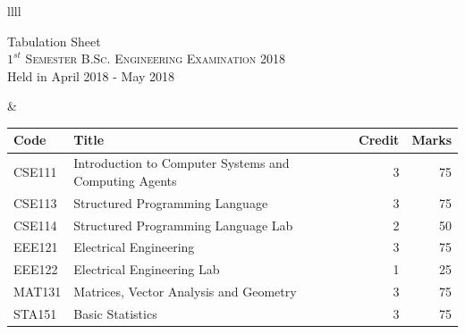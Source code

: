 \documentclass[11pt]{article}
\begin{document}
\begin{table}[ht]
\begin{tabularx}{\linewidth}{llll}
\begin{minipage}[m]{0.35\textwidth}
	\smallskip
	
	{\large {\sc Tabulation Sheet}}\\
	
	\smallskip
	\textsc{$1^{st}$ Semester B.Sc. Engineering Examination 2018}\\
	{Held in April 2018 - May 2018}\\
\end{minipage}
&
\hspace{1cm}
\begin{minipage}[m]{0.3\linewidth} \flushright
	\hspace{-5cm}
	\begin{small}
		\renewcommand{\arraystretch}{1.01}
		\begin{tabular} {|l|l|r|r|}
			\hline \hline Code & Title  & Credit &  Marks \\ \hline
\hline  CSE111 & Introduction to Computer Systems and Computing Agents & 3 & 75  \\
\hline  CSE113 & Structured Programming Language & 3 & 75  \\
\hline  CSE114 & Structured Programming Language Lab & 2 & 50  \\
\hline  EEE121 & Electrical Engineering & 3 & 75  \\
\hline  EEE122 & Electrical Engineering Lab & 1 & 25  \\
\hline  MAT131 & Matrices, Vector Analysis and Geometry & 3 & 75  \\
\hline  STA151 & Basic Statistics & 3 & 75  \\
 \hline
		\end{tabular}
	\end{small} 
\end{minipage}

\end{tabularx}
\end{table}
\end{document}
